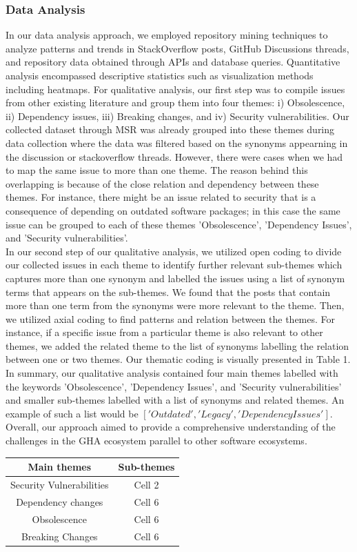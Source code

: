 \documentclass[conference]{IEEEtran}
\begin{document}
        \subsubsection{\textbf{Data Analysis}}

            In our data analysis approach, we employed repository mining techniques to analyze patterns and trends in StackOverflow posts, GitHub Discussions threads, and repository data obtained through APIs and database queries. Quantitative analysis encompassed descriptive statistics such as visualization methods including heatmaps. For qualitative analysis, our first step was to compile issues from other existing literature and group them into four themes: i) Obsolescence, ii) Dependency issues, iii) Breaking changes, and iv) Security vulnerabilities. Our collected dataset through MSR was already grouped into these themes during data collection where the data was filtered based on the synonyms appearning in the discussion or stackoverflow threads. However, there were cases when we had to map the same issue to more than one theme. The reason behind this overlapping is because of the close relation and dependency between these themes. For instance, there might be an issue related to security that is a consequence of depending on outdated software packages; in this case the same issue can be grouped to each of these themes 'Obsolescence', 'Dependency Issues', and 'Security vulnerabilities'. \\
In our second step of our qualitative analysis, we utilized open coding to divide our collected issues in each theme to identify further relevant sub-themes which captures more than one synonym and labelled the issues using a list of synonym terms that appears on the sub-themes. We found that the posts that contain more than one term from the synonyms were more relevant to the theme. Then, we utilized axial coding to find patterns and relation between the themes. For instance, if a specific issue from a particular theme is also relevant to other themes,  we added the related theme to the list of synonyms labelling the relation between one or two themes. Our thematic coding is visually presented in Table 1.\\
In summary, our qualitative analysis contained four main themes labelled with the keywords  'Obsolescence', 'Dependency Issues', and 'Security vulnerabilities' and smaller sub-themes labelled with a list of synonyms and related themes. An example of such a list would be $['Outdated', 'Legacy', 'Dependency Issues' ]$. Overall, our approach aimed to provide a comprehensive understanding of the challenges in the GHA ecosystem parallel to other software ecosystems.\\
\begin{tabular}{|c|c|}
  \hline
  \textbf{Main themes} & \textbf{Sub-themes} \\
  \hline
  \hline
    Security Vulnerabilities & Cell 2  \\
  \hline
   Dependency changes & Cell 6 \\
  \hline
  \hline
   Obsolescence & Cell 6 \\
  \hline
  \hline
   Breaking Changes & Cell 6 \\
  \hline
\end{tabular}
\end{document}
